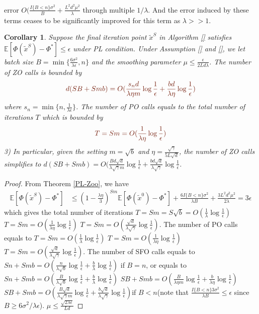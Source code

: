 \documentclass{article}
\newcommand*{\E}{\mathbb{E}}
\newtheorem{corollary}[theorem]{Corollary}
\theoremstyle{definition}
\theoremstyle{remark}
\begin{document}
error $O(\frac{I\{B < n\} \sigma ^2}{B}+\frac{L^2 d^2 \mu^2}{\lambda}$ through multiple $1/\lambda$. And the error induced by these terms ceases to be significantly improved for this term as $\lambda >> 1$.
\begin{corollary}\label{PL-Zo-Cor}
Suppose the final iteration point $\tilde{x}^S$ in Algorithm \ref{} satisfies $\E[\Phi(\tilde{x}^S) - \Phi^*]\leq \epsilon$ under PL condition. Under Assumption \ref{} and \ref{}, we let batch size $B = \min\{\frac{6\sigma^2}{\lambda\epsilon},n\}$ and the smoothing parameter $\mu\leq \frac{\epsilon}{2Ld\lambda}$. The number of ZO calls is bounded by
\[
{\color{Brown}d(SB+Smb) = O(\frac{s_n d}{\lambda\eta m}\log\frac{1}{\epsilon}+\frac{b d}{\lambda\eta}\log\frac{1}{\epsilon})}
\]
where $s_n = \min \{n,\frac{1}{\lambda \epsilon}\}$.
The number of PO calls equals to the total number of iterations $T$ which is bounded by
\[
{\color{Brown} T = Sm = O(\frac{1}{\lambda\eta}\log\frac{1}{\epsilon})}
\]
3) In particular, given the setting  $m=\sqrt{b}$ and {\color{blue}$\eta = \frac{\sqrt{\gamma}}{5 L \sqrt{d}}$}, the number of ZO calls  simplifies to 
{\color{blue}$d(SB+Smb) = O(\frac{Bd\sqrt{d}}{\lambda\sqrt{\gamma} m}\log\frac{1}{\epsilon}+\frac{bd\sqrt{d}}{\lambda\sqrt{\gamma}}\log\frac{1}{\epsilon}$.}
\end{corollary}
\begin{proof}
From Theorem \ref{PL-Zoo}, we have
\begin{align}
\E[\Phi(\widetilde{x}^S) - {\Phi}^*] & \leq   \left(1-\frac{\lambda\eta}{3}\right)^{Sm} \E[\Phi(\widetilde{x}^0) - {\Phi}^*] + \frac{6I\{B < n\} \sigma ^2}{\lambda B}+\frac{3 L^2 d^2 \mu^2}{2\lambda}= 3 \epsilon
\end{align}
which gives the total number of iterations $T = Sm = S\sqrt{b} = O(\frac{1}{\lambda}\log\frac{1}{\epsilon})$ {\color{Brown} $T = Sm = O(\frac{1}{\lambda\eta}\log\frac{1}{\epsilon})$} {\color{Blue} $T = Sm = O(\frac{\sqrt{d}}{\lambda\sqrt{\gamma}}\log\frac{1}{\epsilon})$}. The number of PO calls equals to $T = Sm = O(\frac{1}{\lambda}\log\frac{1}{\epsilon})$ {\color{Brown} $T = Sm = O(\frac{1}{\lambda\eta}\log\frac{1}{\epsilon})$} {\color{Blue} $T = Sm = O(\frac{\sqrt{d}}{\lambda\sqrt{\gamma}}\log\frac{1}{\epsilon})$}. The number of SFO calls equals to $Sn+Smb = O(\frac{n}{\lambda \sqrt{b}}\log\frac{1}{\epsilon}+\frac{b}{\lambda}\log\frac{1}{\epsilon})$ if $B = n$, or equals to  $Sn+Smb = O(\frac{B}{\lambda \sqrt{b}}\log\frac{1}{\epsilon}+\frac{b}{\lambda}\log\frac{1}{\epsilon})$ {\color{Brown}$SB+Smb = O(\frac{B}{\lambda\eta m}\log\frac{1}{\epsilon}+\frac{b}{\lambda\eta}\log\frac{1}{\epsilon})$} {\color{blue}$SB+Smb = O(\frac{B\sqrt{d}}{\lambda\sqrt{\gamma} m}\log\frac{1}{\epsilon}+\frac{b\sqrt{d}}{\lambda\sqrt{\gamma}}\log\frac{1}{\epsilon})$}if $B < n$(note that $\frac{I\{B < n\}3 \sigma ^2}{\lambda B} \leq \epsilon$ since $B \geq 6 {\sigma ^2}/{\lambda \epsilon}$).
{\color{blue} $\mu \leq \frac{\sqrt{2\lambda\epsilon}}{L d}$}
\end{proof}
\end{document}
